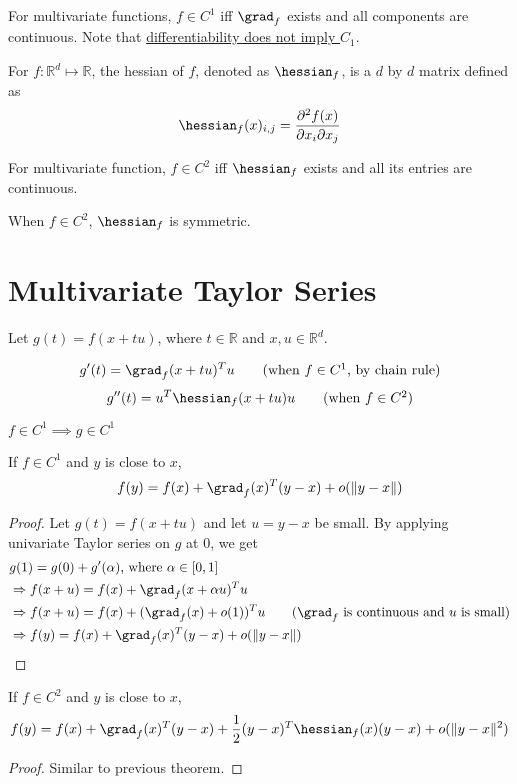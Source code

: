 For multivariate functions, $f \in C^1$ iff $\grad_f$ exists and all components are continuous.
Note that \href{https://calculus.subwiki.org/wiki/Derivative_of_differentiable_function_need_not_be_continuous}
{differentiability does not imply $C_1$}.

\begin{definition} For $f: \mathbb{R}^d \mapsto \mathbb{R}$, the hessian of $f$,
denoted as $\hessian_f$, is a $d$ by $d$ matrix defined as
\[ \hessian_f(x)_{i, j} = \frac{\partial^2 f(x)}{\partial x_i \partial x_j} \]
\end{definition}

For multivariate function, $f \in C^2$ iff $\hessian_f$ exists and all its entries are continuous.

\begin{theorem}
When $f \in C^2$, $\hessian_f$ is symmetric.
\end{theorem}

\section{Multivariate Taylor Series}

Let $g(t) = f(x + tu)$, where $t \in \mathbb{R}$ and $x, u \in \mathbb{R}^d$.

\begin{theorem}
\[ g'(t) = \grad_f(x+tu)^Tu \tag{when $f \in C^1$, by chain rule} \]
\[ g''(t) = u^T \hessian_f(x+tu) u \tag{when $f \in C^2$} \]
\end{theorem}

\begin{theorem} $f \in C^1 \implies g \in C^1$ \end{theorem}

\begin{theorem} If $f \in C^1$ and $y$ is close to $x$,
\[ f(y) = f(x) + \grad_f(x)^T(y-x) + o(\|y-x\|) \]
\end{theorem}
\begin{proof}
Let $g(t) = f(x+tu)$ and let $u = y - x$ be small.
By applying univariate Taylor series on $g$ at 0, we get
\begin{align*}
& g(1) = g(0) + g'(\alpha) \textrm{, where } \alpha \in [0, 1]
\\ &\Rightarrow f(x+u) = f(x) + \grad_f(x + \alpha u)^Tu
\\ &\Rightarrow f(x+u) = f(x) + (\grad_f(x) + o(1))^Tu  \tag{$\grad_f$ is continuous and $u$ is small}
\\ &\Rightarrow f(y) = f(x) + \grad_f(x)^T(y-x) + o(\|y-x\|)
\end{align*}
\end{proof}

\begin{theorem} If $f \in C^2$ and $y$ is close to $x$,
\[ f(y) = f(x) + \grad_f(x)^T(y-x) + \frac{1}{2}(y-x)^T\hessian_f(x)(y-x) + o(\|y-x\|^2) \]
\end{theorem}
\begin{proof}Similar to previous theorem.\end{proof}


